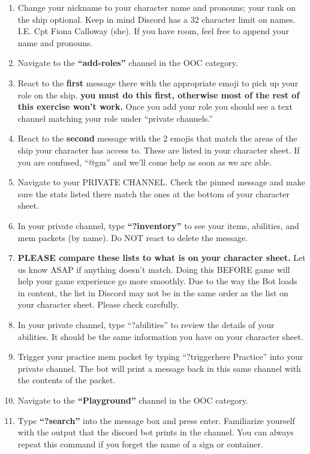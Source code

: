 \documentclass[green]{TMFHope}
\begin{document}
\begin{enumerate}
  \item Change your nickname to your character name and pronouns; your rank on the ship optional. Keep in mind Discord has a 32 character limit on names. I.E. Cpt Fiona Calloway (she). If you have room, feel free to append your name and pronouns.
  \item Navigate to the \textbf{``add-roles''} channel in the OOC category.
  \item React to the \textbf{first} message there with the appropriate emoji to pick up your role on the ship. \textbf{you must do this first, otherwise most of the rest of this exercise won't work.} Once you add your role you should see a text channel matching your role under ``private channels.''
	\item React to the \textbf{second} message with the 2 emojis that match the areas of the ship your character has access to. These are listed in your character sheet. If you are confused, ``@gm'' and we'll come help as soon as we are able.
  \item Navigate to your PRIVATE CHANNEL. Check the pinned message and make sure the stats listed there match the ones at the bottom of your character sheet.
	\item In your private channel, type \textbf{``?inventory''} to see your items, abilities, and mem packets (by name). Do NOT react to delete the message.
	\item \textbf{PLEASE compare these lists to what is on your character sheet.} Let us know ASAP if anything doesn't match. Doing this BEFORE game will help your game experience go more smoothly. Due to the way the Bot loads in content, the list in Discord may not be in the same order as the list on your character sheet. Please check carefully.
	\item In your private channel, type ``?abilities'' to review the details of your abilities. It should be the same information you have on your character sheet.
  \item Trigger your practice mem packet by typing ``?triggerhere Practice'' into your private channel. The bot will print a message back in this same channel with the contents of the packet.
  \item Navigate to the \textbf{``Playground''} channel in the OOC category.
  \item Type \textbf{``?search''} into the message box and press enter. Familiarize yourself with the output that the discord  bot prints in the channel. You can always repeat this command if you forget the name of a sign or container.

\end{enumerate}
\end{document}
